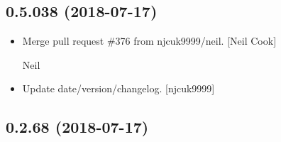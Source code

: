 \documentclass[a4paper,10pt,english]{report}
\begin{document}
\subsection{0.5.038 (2018-07-17)}
\label{\detokenize{misc/changelog:id390}}\begin{itemize}
\item {} 
Merge pull request \#376 from njcuk9999/neil. {[}Neil Cook{]}

Neil

\item {} 
Update date/version/changelog. {[}njcuk9999{]}

\end{itemize}


\subsection{0.2.68 (2018-07-17)}
\end{document}

